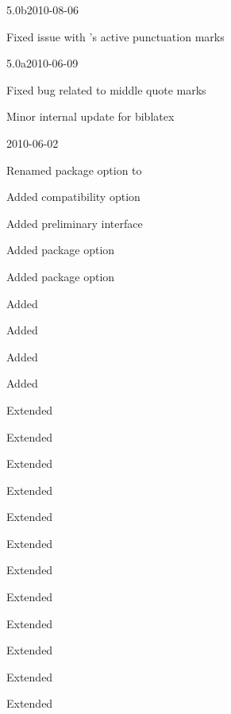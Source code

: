 \documentclass{ltxdockit}[2010/09/26]
\begin{document}
\begin{changelog}
\begin{release}{5.0b}{2010-08-06}
\item Fixed issue with 's active punctuation marks
\end{release}

\begin{release}{5.0a}{2010-06-09}
\item Fixed bug related to middle quote marks
\item Minor internal update for biblatex
\end{release}

\begin{release}{5.0}{2010-06-02}
\item Renamed package option  to 
\item Added compatibility option 
\item Added preliminary  interface
\item Added package option 
\item Added package option 
\item Added 
\item Added 
\item Added 
\item Added 
\item Extended 
\item Extended 
\item Extended 
\item Extended 
\item Extended 
\item Extended 
\item Extended 
\item Extended 
\item Extended 
\item Extended 
\item Extended 
\item Extended 

\end{release}
\end{changelog}
\end{document}
